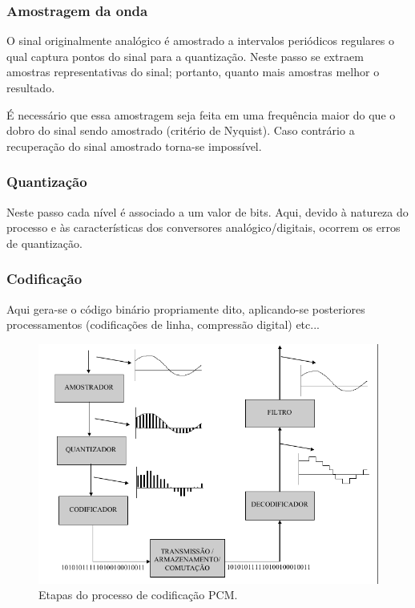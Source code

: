 \documentclass[]{report}
\begin{document}
\subsubsection{Amostragem da onda}
O sinal originalmente analógico é amostrado a intervalos periódicos regulares o qual captura pontos do sinal para a quantização. Neste passo se extraem amostras representativas do sinal; portanto, quanto mais amostras melhor o resultado.

É necessário que essa amostragem seja feita em uma frequência maior do que o dobro do sinal sendo amostrado (critério de Nyquist). Caso contrário a recuperação do sinal amostrado torna-se impossível.
\subsubsection{Quantização}
Neste passo cada nível é associado a um valor de bits. Aqui, devido à natureza do processo e às características dos conversores analógico/digitais, ocorrem os erros de quantização.
\subsubsection{Codificação}
Aqui gera-se o código binário propriamente dito, aplicando-se posteriores processamentos (codificações de linha, compressão digital) etc...

\begin{figure}[H]
\begin{center}
\includegraphics[scale=0.5,clip]{./imagens/etapas_PCM.png}
\end{center}
\caption{Etapas do processo de codificação PCM. \cite{moecke}}
\label{fig:pcm}
\end{figure}
\end{document}
